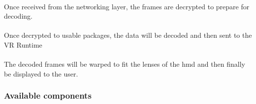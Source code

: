 \paragraph{\textCDCR}
Once received from the networking layer, the frames are decrypted to prepare for decoding.
\paragraph{\textCDCO}
Once decrypted to usable packages, the data will be decoded and then sent to the VR Runtime
\paragraph{\textCRD}
The decoded frames will be warped to fit the lenses of the \acrshort{hmd} and then finally be displayed to the user.


\subsubsection{Available components}
\renewcommand{\arraystretch}{1.5}

